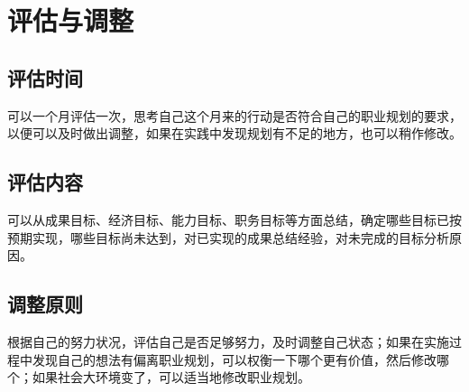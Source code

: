 \documentclass{article}
\begin{document}
\section{评估与调整}
\subsection{评估时间}
可以一个月评估一次，思考自己这个月来的行动是否符合自己的职业规划的要求，以便可以及时做出调整，如果在实践中发现规划有不足的地方，也可以稍作修改。
\subsection{评估内容}
可以从成果目标、经济目标、能力目标、职务目标等方面总结，确定哪些目标已按预期实现，哪些目标尚未达到，对已实现的成果总结经验，对未完成的目标分析原因。
\subsection{调整原则}
根据自己的努力状况，评估自己是否足够努力，及时调整自己状态；如果在实施过程中发现自己的想法有偏离职业规划，可以权衡一下哪个更有价值，然后修改哪个；如果社会大环境变了，可以适当地修改职业规划。
\end{document}
